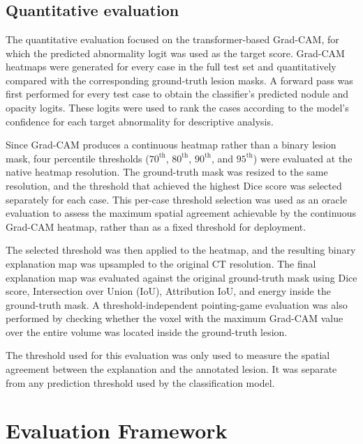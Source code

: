 \section{}

\subsection{Quantitative evaluation}
\label{subsec:gradcam-eval}

The quantitative evaluation focused on the transformer-based Grad-CAM,
for which the predicted abnormality logit was used as the target score.
Grad-CAM heatmaps were generated for every case in the full test set and
quantitatively compared with the corresponding ground-truth lesion masks.
A forward pass was first performed for every test case to obtain the
classifier's predicted nodule and opacity logits. These logits were used to
rank the cases according to the model's confidence for each target abnormality
for descriptive analysis.

Since Grad-CAM produces a continuous heatmap rather than a binary lesion mask,
four percentile thresholds ($70^{\text{th}}$, $80^{\text{th}}$,
$90^{\text{th}}$, and $95^{\text{th}}$) were evaluated at the native heatmap
resolution. The ground-truth mask was resized to the same resolution, and the
threshold that achieved the highest Dice score was selected separately for
each case. This per-case threshold selection was used as an oracle evaluation
to assess the maximum spatial agreement achievable by the continuous Grad-CAM
heatmap, rather than as a fixed threshold for deployment.

The selected threshold was then applied to the heatmap, and the resulting
binary explanation map was upsampled to the original CT resolution. The final
explanation map was evaluated against the original ground-truth mask using
Dice score, Intersection over Union (IoU), Attribution IoU, and energy inside
the ground-truth mask. A threshold-independent pointing-game evaluation was
also performed by checking whether the voxel with the maximum Grad-CAM value
over the entire volume was located inside the ground-truth lesion.

The threshold used for this evaluation was only used to measure the spatial
agreement between the explanation and the annotated lesion. It was separate
from any prediction threshold used by the classification model.

\section{Evaluation Framework}
\label{sec:eval-framework}

